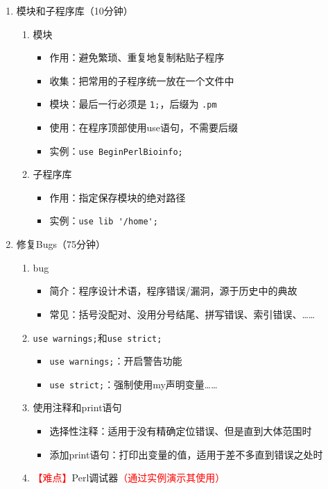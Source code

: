 \documentclass{TIJMUjiaoanLL}
\begin{document}
\begin{enumerate}
  \item 模块和子程序库（10分钟）
    \begin{enumerate}
      \item 模块
        \begin{itemize}
           \item 作用：避免繁琐、重复地复制粘贴子程序
           \item 收集：把常用的子程序统一放在一个文件中
	   \item 模块：最后一行必须是 \verb|1;|，后缀为 \verb|.pm|
	   \item 使用：在程序顶部使用use语句，不需要后缀
	   \item 实例：\verb|use BeginPerlBioinfo;|
        \end{itemize}
      \item 子程序库
	\begin{itemize}
	  \item 作用：指定保存模块的绝对路径
	  \item 实例：\verb|use lib '/home';|
	\end{itemize}
    \end{enumerate}
  \item 修复Bugs（75分钟）
    \begin{enumerate}
      \item bug
	\begin{itemize}
	  \item 简介：程序设计术语，程序错误/漏洞，源于历史中的典故
	  \item 常见：括号没配对、没用分号结尾、拼写错误、索引错误、……
	\end{itemize}
      \item \verb|use warnings;|和\verb|use strict;|
	\begin{itemize}
	  \item \verb|use warnings;|：开启警告功能
	  \item \verb|use strict;|：强制使用my声明变量……
	\end{itemize}
      \item 使用注释和print语句
	\begin{itemize}
	  \item 选择性注释：适用于没有精确定位错误、但是直到大体范围时
	  \item 添加print语句：打印出变量的值，适用于差不多直到错误之处时
	\end{itemize}
      \item \textcolor{red}{【难点】}Perl调试器\textcolor{red}{（通过实例演示其使用）}
	\begin{itemize}

\end{itemize}
\end{enumerate}
\end{enumerate}
\end{document}
